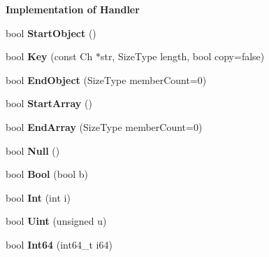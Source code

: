 \begin{Indent}{\bf Implementation of Handler}
\begin{DoxyCompactItemize}
\item 
bool {\bfseries Start\+Object} ()\hypertarget{class_pretty_writer_a27bdda225dc152b8974e44c1df7525b7}{}\label{class_pretty_writer_a27bdda225dc152b8974e44c1df7525b7}

\item 
bool {\bfseries Key} (const Ch $\ast$str, Size\+Type length, bool copy=false)\hypertarget{class_pretty_writer_a20ecbe1d31a871e4da4a3899b40ad3cd}{}\label{class_pretty_writer_a20ecbe1d31a871e4da4a3899b40ad3cd}

\item 
bool {\bfseries End\+Object} (Size\+Type member\+Count=0)\hypertarget{class_pretty_writer_a6bfdfa4193193ef763cce5c592c4d20c}{}\label{class_pretty_writer_a6bfdfa4193193ef763cce5c592c4d20c}

\item 
bool {\bfseries Start\+Array} ()\hypertarget{class_pretty_writer_aec7fdf4798a3af5e31c147633f4798ed}{}\label{class_pretty_writer_aec7fdf4798a3af5e31c147633f4798ed}

\item 
bool {\bfseries End\+Array} (Size\+Type member\+Count=0)\hypertarget{class_pretty_writer_a1e9d97fc950d349f55abd864c787ff37}{}\label{class_pretty_writer_a1e9d97fc950d349f55abd864c787ff37}

\item 
bool {\bfseries Null} ()\hypertarget{class_pretty_writer_aa144f2d0f0c3c69248cdbe957349528c}{}\label{class_pretty_writer_aa144f2d0f0c3c69248cdbe957349528c}

\item 
bool {\bfseries Bool} (bool b)\hypertarget{class_pretty_writer_a6e765ee7ada5ed40f317c78a98f6f90b}{}\label{class_pretty_writer_a6e765ee7ada5ed40f317c78a98f6f90b}

\item 
bool {\bfseries Int} (int i)\hypertarget{class_pretty_writer_aa1815263e61cb7af3b6dfba480a0f481}{}\label{class_pretty_writer_aa1815263e61cb7af3b6dfba480a0f481}

\item 
bool {\bfseries Uint} (unsigned u)\hypertarget{class_pretty_writer_a8c82302877a5588eae77eb7d042c49ef}{}\label{class_pretty_writer_a8c82302877a5588eae77eb7d042c49ef}

\item 
bool {\bfseries Int64} (int64\+\_\+t i64)\hypertarget{class_pretty_writer_ad42b797429f4ee19efdce610f5aff976}{}\label{class_pretty_writer_ad42b797429f4ee19efdce610f5aff976}


\end{DoxyCompactItemize}
\end{Indent}
